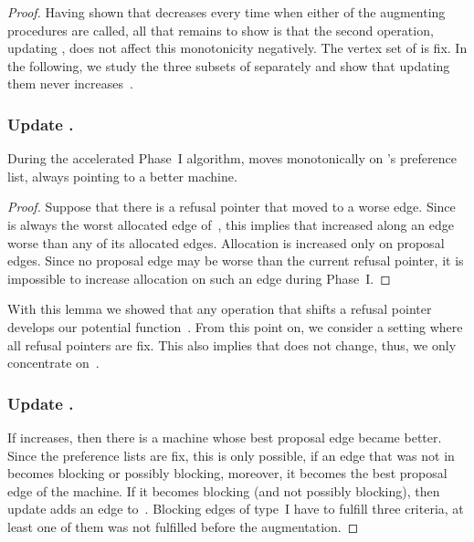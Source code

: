 \documentclass{llncs}
\begin{document}
\begin{proof}
Having shown that  decreases every time when either of the augmenting procedures are called, all that remains to show is that the second operation, updating , does not affect this monotonicity negatively. The vertex set of  is fix. In the following, we study the three subsets of  separately and show that updating them never increases~. 

\subsubsection*{Update .}

\begin{lemma}
\label{r_mon}
	During the accelerated Phase~I algorithm,  moves monotonically on 's preference list, always pointing to a better machine.
\end{lemma}

\begin{proof}
	Suppose that there is a refusal pointer that moved to a worse edge. Since  is always the worst allocated edge of~, this implies that  increased  along an edge worse than any of its allocated edges. Allocation is increased only on proposal edges. Since no proposal edge may be worse than the current refusal pointer, it is impossible to increase allocation on such an edge during Phase~I.
\end{proof}

With this lemma we showed that any operation that shifts a refusal pointer develops our potential function~. From this point on, we consider a setting where all refusal pointers are fix. This also implies that  does not change, thus, we only concentrate on~.

\subsubsection*{Update .}

If  increases, then there is a machine  whose best proposal edge became better. Since the preference lists are fix, this is only possible, if an edge that was not in  becomes blocking or possibly blocking, moreover, it becomes the best proposal edge of the machine. If it becomes blocking (and not possibly blocking), then update  adds an edge  to~. Blocking edges of type~I have to fulfill three criteria, at least one of them was not fulfilled before the augmentation.


\end{proof}
\end{document}
